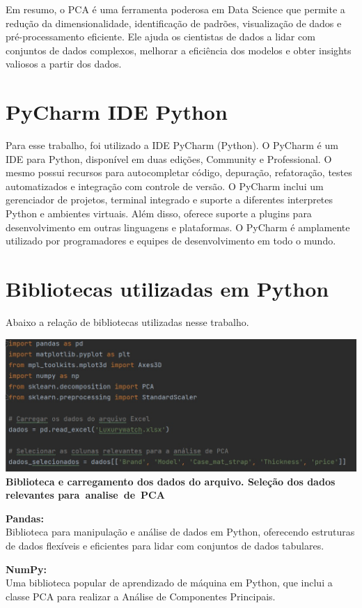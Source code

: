 \documentclass[12pt, a4paper]{article}
\begin{document}
    
Em resumo, o PCA é uma ferramenta poderosa em Data Science que permite a redução da dimensionalidade, identificação de padrões, visualização de dados e pré-processamento eficiente. Ele ajuda os cientistas de dados a lidar com conjuntos de dados complexos, melhorar a eficiência dos modelos e obter insights valiosos a partir dos dados.
\section{PyCharm IDE Python}

Para esse trabalho, foi utilizado a IDE PyCharm (Python).
O PyCharm é um IDE para Python, disponível em duas edições, Community e Professional. O mesmo possui recursos para autocompletar código, depuração, refatoração, testes automatizados e integração com controle de versão. O PyCharm inclui um gerenciador de projetos, terminal integrado e suporte a diferentes interpretes Python e ambientes virtuais. Além disso, oferece suporte a plugins para desenvolvimento em outras linguagens e plataformas. O PyCharm é amplamente utilizado por programadores e equipes de desenvolvimento em todo o mundo.

\section{Bibliotecas utilizadas em Python}
Abaixo a relação de bibliotecas utilizadas nesse trabalho.
\begin{center}
    \includegraphics[width=14cm]{figura1}
 \textbf{Biblioteca e carregamento dos dados do arquivo. 
Seleção dos dados relevantes para analise de PCA}   
\end{center}

\textbf{Pandas:}\\
Biblioteca para manipulação e análise de dados em Python, oferecendo estruturas de dados flexíveis e eficientes para lidar com conjuntos de dados tabulares.

\textbf{NumPy:}\\
Uma biblioteca popular de aprendizado de máquina em Python, que inclui a classe PCA para realizar a Análise de Componentes Principais.
\end{document}
